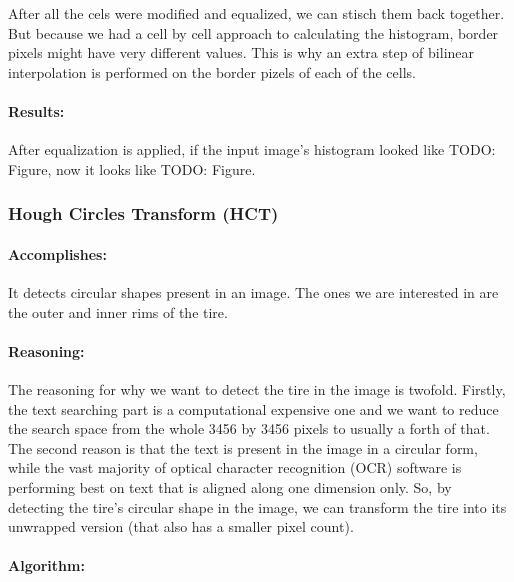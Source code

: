 After all the cels were modified and equalized, we can stisch them back together. But because we had a cell by cell approach to calculating the histogram, border pixels might have very different values. This is why an extra step of bilinear interpolation is performed on the border pizels of each of the cells.

\paragraph*{Results:}\mbox{}\par
After equalization is applied, if the input image's histogram looked like TODO: Figure, now it looks like TODO: Figure.


\subsubsection{Hough Circles Transform (HCT)}
\label{subsubsec:hough_circles_transform}

\paragraph*{Accomplishes:}\mbox{}\par
It detects circular shapes present in an image. The ones we are interested in are the outer and inner rims of the tire.

\paragraph*{Reasoning:}\mbox{}\par
The reasoning for why we want to detect the tire in the image is twofold. Firstly, the text searching part is a computational expensive one and we want to reduce the search space from the whole 3456 by 3456 pixels to usually a forth of that. The second reason is that the text is present in the image in a circular form, while the vast majority of optical character recognition (OCR) software is performing best on text that is aligned along one dimension only. So, by detecting the tire's circular shape in the image, we can transform the tire into its unwrapped version (that also has a smaller pixel count).

\paragraph*{Algorithm:}\mbox{}\par

